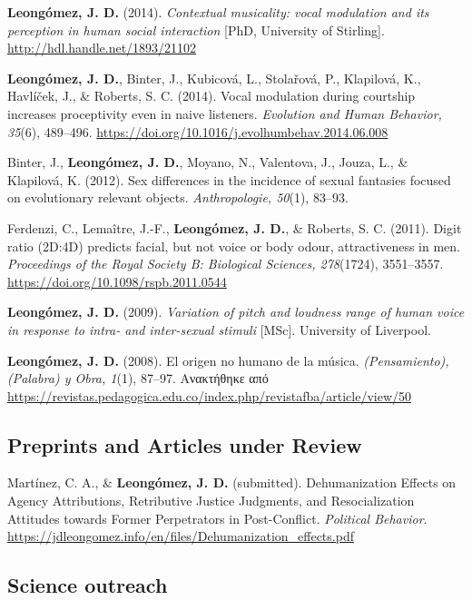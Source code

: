 \documentclass[11pt,a4paper,]{awesome-cv}
\begin{document}
\textbf{Leongómez, J. D.} (2014). \emph{Contextual musicality: vocal
modulation and its perception in human social interaction} {[}PhD,
University of Stirling{]}. \url{http://hdl.handle.net/1893/21102}

\textbf{Leongómez, J. D.}, Binter, J., Kubicová, L., Stolařová, P.,
Klapilová, K., Havlíček, J., \& Roberts, S. C. (2014). Vocal modulation
during courtship increases proceptivity even in naive listeners.
\emph{Evolution and Human Behavior, 35}(6), 489--496.
\url{https://doi.org/10.1016/j.evolhumbehav.2014.06.008}

Binter, J., \textbf{Leongómez, J. D.}, Moyano, N., Valentova, J., Jouza,
L., \& Klapilová, K. (2012). Sex differences in the incidence of sexual
fantasies focused on evolutionary relevant objects. \emph{Anthropologie,
50}(1), 83--93.

Ferdenzi, C., Lemaître, J.-F., \textbf{Leongómez, J. D.}, \& Roberts, S.
C. (2011). Digit ratio (2D:4D) predicts facial, but not voice or body
odour, attractiveness in men. \emph{Proceedings of the Royal Society B:
Biological Sciences, 278}(1724), 3551--3557.
\url{https://doi.org/10.1098/rspb.2011.0544}

\textbf{Leongómez, J. D.} (2009). \emph{Variation of pitch and loudness
range of human voice in response to intra- and inter-sexual stimuli}
{[}MSc{]}. University of Liverpool.

\textbf{Leongómez, J. D.} (2008). El origen no humano de la música.
\emph{(Pensamiento), (Palabra) y Obra, 1}(1), 87--97. Ανακτήθηκε από
\url{https://revistas.pedagogica.edu.co/index.php/revistafba/article/view/50}

\endgroup

\hypertarget{section-1}{%
\subsection{\texorpdfstring{\textbf{Preprints and Articles under Review}}{}}\label{section-1}}

\begingroup
\setlength{\parindent}{-0.5in}
\setlength{\leftskip}{0.5in}

Martínez, C. A., \& \textbf{Leongómez, J. D.} (submitted).
Dehumanization Effects on Agency Attributions, Retributive Justice
Judgments, and Resocialization Attitudes towards Former Perpetrators in
Post-Conflict. \emph{Political Behavior}.
\url{https://jdleongomez.info/en/files/Dehumanization_effects.pdf}

\endgroup

\hypertarget{section-2}{%
\subsection{\texorpdfstring{\textbf{Science outreach}}{}}\label{section-2}}
\end{document}
